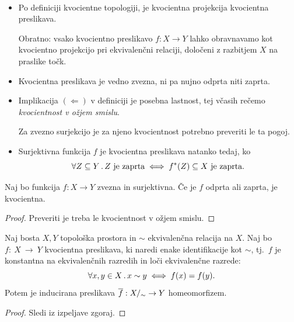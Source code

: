 \begin{opomba}
    \
    \begin{itemize}
        \item Po definiciji kvocientne topologiji, je kvocientna projekcija kvocientna preslikava. 
        
        Obratno: vsako kvocientno preslikavo \(f: X \to Y\) lahko obravnavamo kot kvocientno projekcijo pri ekvivalenčni relaciji, določeni z razbitjem \(X\) na praslike točk.
        \item Kvocientna preslikava je vedno zvezna, ni pa nujno odprta niti zaprta.
        \item Implikacija \((\Leftarrow)\) v definiciji je posebna lastnost, tej včasih rečemo \emph{kvocientnost v ožjem smislu}.
        
        Za zvezno surjekcijo je za njeno kvocientnost potrebno preveriti le ta pogoj.
        \item Surjektivna funkcija \(f\) je kvocientna preslikava natanko tedaj, ko 
        \[\forall Z \subseteq Y \,.\, Z \ \text{je zaprta} \iff f^{*}(Z) \subseteq X \ \text{je zaprta}.\]
    \end{itemize}
\end{opomba}

\begin{lema}
    Naj bo funkcija \(f: X \to Y\) zvezna in surjektivna. Če je \(f\) odprta ali zaprta, je kvocientna.
\end{lema}

\begin{proof}
    Preveriti je treba le kvocientnost v ožjem smislu.
\end{proof}

\begin{izrek}
    Naj bosta \(X, Y\) topološka prostora in \(\sim\) ekvivalenčna relacija na \(X\). Naj bo \(f:~X~\to~Y\) kvocientna preslikava, ki naredi enake identifikacije kot \(\sim\), tj.\ \(f\) je konstantna na ekvivalenčnih razredih in loči ekvivalenčne razrede:
    \[\forall x, y \in X \,.\, x \sim y \iff f(x) = f(y).\]
    Potem je inducirana preslikava \(\overline{f}: {X/_\sim} \to Y\) homeomorfizem.
\end{izrek}

\begin{proof}
    Sledi iz izpeljave zgoraj.
\end{proof}


